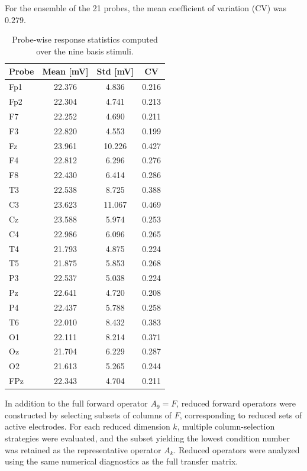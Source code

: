 For the ensemble of the 21 probes, the mean coefficient of variation (CV) was $0.279$.

\begin{table}[htbp]
\centering
\caption[Probe-wise response statistics]{Probe-wise response statistics computed over the nine basis stimuli.}
\label{tab:probe_stats}
\small
\begin{tabular}{lccc}
\toprule
\textbf{Probe} & \textbf{Mean [mV]} & \textbf{Std [mV]} & \textbf{CV} \\
\midrule
Fp1 & 22.376 & 4.836 & 0.216 \\
Fp2 & 22.304 & 4.741 & 0.213 \\
F7 & 22.252 & 4.690 & 0.211 \\
F3 & 22.820 & 4.553 & 0.199 \\
Fz & 23.961 & 10.226 & 0.427 \\
F4 & 22.812 & 6.296 & 0.276 \\
F8 & 22.430 & 6.414 & 0.286 \\
T3 & 22.538 & 8.725 & 0.388 \\
C3 & 23.623 & 11.067 & 0.469 \\
Cz & 23.588 & 5.974 & 0.253 \\
C4 & 22.986 & 6.096 & 0.265  \\
T4 & 21.793 & 4.875 & 0.224 \\
T5 & 21.875 & 5.853 & 0.268 \\
P3 & 22.537 & 5.038 & 0.224 \\
Pz & 22.641 & 4.720 & 0.208  \\
P4 & 22.437 & 5.788 & 0.258 \\
T6 & 22.010 & 8.432 & 0.383  \\
O1 & 22.111 & 8.214 & 0.371  \\
Oz & 21.704 & 6.229 & 0.287  \\
O2 & 21.613 & 5.265 & 0.244 \\
FPz & 22.343 & 4.704 & 0.211 \\
\bottomrule
\end{tabular}
\end{table}


In addition to the full forward operator $A_9 = F$, reduced forward operators were
constructed by selecting subsets of columns of $F$, corresponding to reduced sets
of active electrodes. For each reduced dimension $k$, multiple column-selection
strategies were evaluated, and the subset yielding the lowest condition number was
retained as the representative operator $A_k$. Reduced operators were analyzed
using the same numerical diagnostics as the full transfer matrix.

